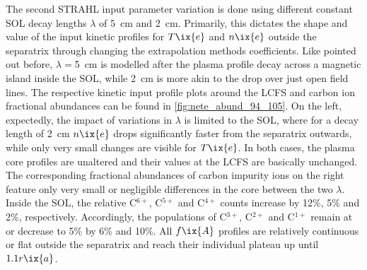                 The second STRAHL input parameter variation is done using different constant SOL decay lengths $\lambda$ of \SI{5}{\centi\meter} and \SI{2}{\centi\meter}. Primarily, this dictates the shape and value of the input kinetic profiles for $T\ix{e}$ and $n\ix{e}$ outside the separatrix through changing the extrapolation methods coefficients. Like pointed out before, $\lambda=$\SI{5}{\centi\meter} is modelled after the plasma profile decay across a magnetic island inside the SOL, while \SI{2}{\centi\meter} is more akin to the drop over just open field lines. The respective kinetic input profile plots around the LCFS and carbon ion fractional abundances can be found in \cref{fig:nete_abund_94_105}. On the left, expectedly, the impact of variations in $\lambda$ is limited to the SOL, where for a decay length of \SI{2}{\centi\meter} $n\ix{e}$ drops significantly faster from the separatrix outwards, while only very small changes are visible for $T\ix{e}$. In both cases, the plasma core profiles are unaltered and their values at the LCFS are basically unchanged. The corresponding fractional abundances of carbon impurity ions on the right feature only very small or negligible differences in the core between the two $\lambda$. Inside the SOL, the relative C$^{6+}$, C$^{5+}$ and C$^{4+}$ counts increase by 12\%, 5\% and 2\%, respectively. Accordingly, the populations of C$^{3+}$, C$^{2+}$ and C$^{1+}$ remain at or decrease to 5\% by 6\% and 10\%. All $f\ix{A}$ profiles are relatively continuous or flat outside the separatrix and reach their individual plateau up until $1.1r\ix{a}$.\\%
%
                \begin{figure}[t]%
                    \centering%
                    \begin{minipage}[b]{0.48\textwidth}%
                        \centering%
                    \end{minipage}%
                    \hfill%
                    \begin{minipage}[b]{0.48\textwidth}%
                        \centering%
                    \end{minipage}%
                    \label{fig:rad_ratios_total_94_105}%
                \end{figure}%
